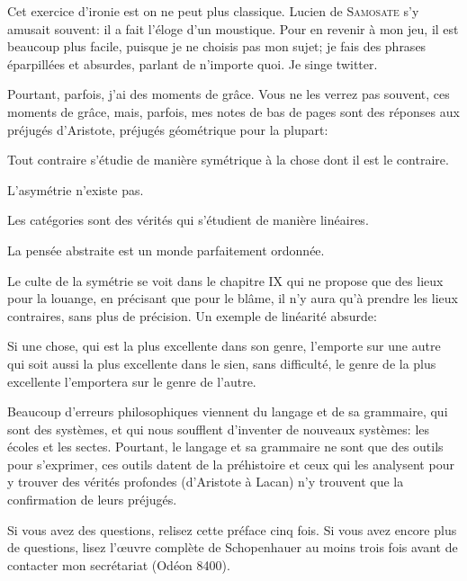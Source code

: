 Cet exercice d'ironie est on ne peut plus classique. Lucien de \textsc{Samosate} s'y amusait souvent: il a fait l'éloge d'un
moustique. Pour en revenir à mon jeu, il est beaucoup plus facile, puisque je ne choisis pas mon sujet; je fais des phrases
éparpillées et absurdes, parlant de n'importe quoi. Je singe twitter.

Pourtant, parfois, j'ai des moments de grâce. Vous ne les verrez pas souvent, ces moments de grâce, mais, parfois, mes notes
de bas de pages sont des réponses aux préjugés d'Aristote, préjugés géométrique pour la plupart:

\begin{emphpar}
	Tout contraire s'étudie de manière symétrique à la chose dont il est le contraire.

	L'asymétrie n'existe pas.

	Les catégories sont des vérités qui s'étudient de manière linéaires.

	La pensée abstraite est un monde parfaitement ordonnée.
\end{emphpar}

Le culte de la symétrie se voit dans le chapitre IX qui ne propose que des lieux pour la louange, en précisant que pour le
blâme, il n'y aura qu'à prendre les lieux contraires, sans plus de précision. Un exemple de linéarité absurde:

\begin{lieu}
	Si une chose, qui est la plus excellente dans son genre, l'emporte sur une autre qui soit aussi la plus excellente
	dans le sien, sans difficulté, le genre de la plus excellente l'emportera sur le genre de l'autre.
\end{lieu}

Beaucoup d'erreurs philosophiques viennent du langage et de sa grammaire, qui sont des systèmes, et qui nous soufflent
d'inventer de nouveaux systèmes: les écoles et les sectes. Pourtant, le langage et sa grammaire ne sont que des outils
pour s'exprimer, ces outils datent de la préhistoire et ceux qui les analysent pour y trouver des vérités profondes
(d'Aristote à Lacan) n'y trouvent que la confirmation de leurs préjugés.

\bigbreak

Si vous avez des questions, relisez cette préface cinq fois. Si vous avez encore plus de questions, lisez l’œuvre
complète de Schopenhauer au moins trois fois avant de contacter mon secrétariat (Odéon 8400).


\begin{comment}

En terme d'éthique, les végans sont aux français moyens ce que que les français moyens sont aux cannibales par loisirs.

\end{comment}

